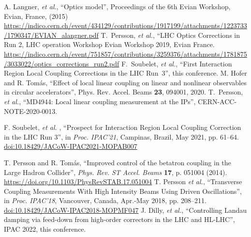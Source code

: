 \documentclass{cernatsnote}
\begin{document}
\begin{thebibliography}{99}
 A. Langner, {\it et al.}, “Optics model”, Proceedings of the 6th Evian Workshop,
Evian, France, (2015) \url{https://indico.cern.ch/event/434129/contributions/1917199/attachments/1223733/1790347/EVIAN_alangner.pdf}
%
T.~Persson, {\it et al.}, ``LHC Optics Corrections in Run 2, LHC operation Workshop Evian Workshop 2019, Evian France.
\url{https://indico.cern.ch/event/751857/contributions/3259376/attachments/1781875/3033022/optics_corrections_run2.pdf}
%
 F.~Soubelet, {\it et al.}, ``First Interaction Region Local Coupling Corrections in the LHC Run~3'', this conference.
%
 M. Hofer and R. Tom\'as, ``Effect of local linear coupling on linear and nonlinear observables in circular accelerators'',
Phys. Rev. Accel. Beams {\bf23}, 094001, 2020.
%
 T.~Persson, {\it et al.}, ``MD4944: Local linear coupling measurement at the IPs'', CERN-ACC-NOTE-2020-0013.

   F. Soubelet,  {\it et al.} ,
   \textquotedblleft{Prospect for Interaction Region Local Coupling Correction in the LHC Run 3}\textquotedblright,
   in \emph{Proc. IPAC’21}, Campinas, Brazil, May 2021, pp. 61--64.
   \url{doi:10.18429/JACoW-IPAC2021-MOPAB007}  

 T. Persson and R. Tom\'as, ``Improved control of the betatron coupling in the Large Hadron Collider'',
{\it Phys. Rev. ST Accel. Beams} {\bf 17}, p. 051004 (2014).
\url{https://doi.org/10.1103/PhysRevSTAB.17.051004}
%
    T. Persson \emph{et al.},
   \textquotedblleft{Transverse Coupling Measurements With High Intensity Beams Using Driven Oscillations}\textquotedblright,
   in \emph{Proc. IPAC’18}, Vancouver, Canada, Apr.-May 2018, pp. 208--211.
   \url{doi:10.18429/JACoW-IPAC2018-MOPMF047}    
%
 J. Dilly, {\it et al.}, ``Controlling Landau damping via feed-down from high-order correctors in the LHC and HL-LHC'', IPAC 2022, this conference.

%


\end{thebibliography}
\end{document}
